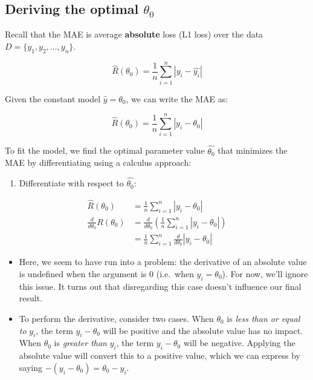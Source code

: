 \documentclass[
  letterpaper,
  DIV=11,
  numbers=noendperiod]{scrreprt}
\providecommand{\tightlist}{%
  \setlength{\itemsep}{0pt}\setlength{\parskip}{0pt}}\usepackage{longtable,booktabs,array}
\begin{document}
\subsection{\texorpdfstring{Deriving the optimal
\(\theta_0\)}{Deriving the optimal \textbackslash theta\_0}}\label{deriving-the-optimal-theta_0-1}

Recall that the MAE is average \textbf{absolute} loss (L1 loss) over the
data \(D = \{y_1, y_2, ..., y_n\}\).

\[\hat{R}(\theta_0) = \frac{1}{n}\sum^{n}_{i=1} |y_i - \hat{y_i}| \]

Given the constant model \(\hat{y} = \theta_0\), we can write the MAE
as:

\[\hat{R}(\theta_0) = \frac{1}{n}\sum^{n}_{i=1} |y_i - \theta_0| \]

To fit the model, we find the optimal parameter value \(\hat{\theta_0}\)
that minimizes the MAE by differentiating using a calculus approach:

\begin{enumerate}
\def\labelenumi{\arabic{enumi}.}
\tightlist
\item
  Differentiate with respect to \(\hat{\theta_0}\):
\end{enumerate}

\[
\begin{align}
\hat{R}(\theta_0) &= \frac{1}{n}\sum^{n}_{i=1} |y_i - \theta_0| \\
\frac{d}{d\theta_0} R(\theta_0) &= \frac{d}{d\theta_0} \left(\frac{1}{n} \sum^{n}_{i=1} |y_i - \theta_0| \right) \\
&= \frac{1}{n} \sum^{n}_{i=1} \frac{d}{d\theta_0} |y_i - \theta_0|
\end{align}
\]

\begin{itemize}
\tightlist
\item
  Here, we seem to have run into a problem: the derivative of an
  absolute value is undefined when the argument is 0 (i.e.~when
  \(y_i = \theta_0\)). For now, we'll ignore this issue. It turns out
  that disregarding this case doesn't influence our final result.
\item
  To perform the derivative, consider two cases. When \(\theta_0\) is
  \emph{less than or equal to} \(y_i\), the term \(y_i - \theta_0\) will
  be positive and the absolute value has no impact. When \(\theta_0\) is
  \emph{greater than} \(y_i\), the term \(y_i - \theta_0\) will be
  negative. Applying the absolute value will convert this to a positive
  value, which we can express by saying
  \(-(y_i - \theta_0) = \theta_0 - y_i\).
\end{itemize}
\end{document}
